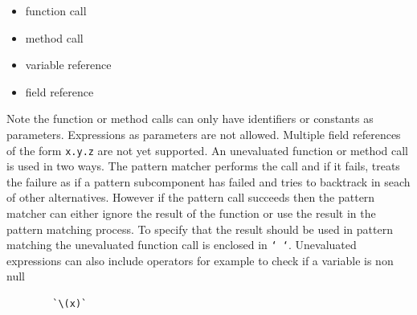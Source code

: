 \documentclass[letterpaper,12pt]{article}
\begin{document}
\begin{itemize}
\item function call
\item method call
\item variable reference
\item field reference
\end{itemize}

Note the function or method calls can only have identifiers or
constants as parameters. Expressions as parameters are not
allowed. Multiple field references of the form \texttt{x.y.z} are
not yet supported. An unevaluated function or method call is used in two
ways. The pattern matcher performs the call and if it fails, treats the
failure as if a pattern subcomponent has failed and tries to
backtrack in seach of other alternatives. However if the pattern call
succeeds then the pattern matcher can either ignore the result of the
function or use the result in the pattern matching process. To specify
that the result should be used in pattern matching the unevaluated
function call is enclosed in \texttt{` `}.  Unevaluated expressions
can also include operators for example to check if a variable is non
null

\begin{verbatim}
        `\(x)`
\end{verbatim}
\end{document}
